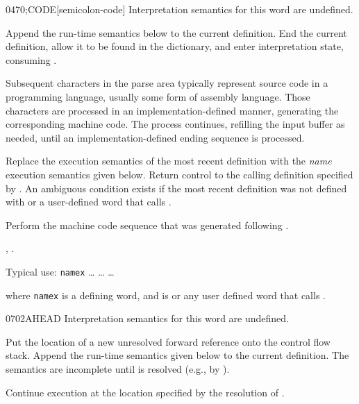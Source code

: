 \begin{worddef}{0470}{;CODE}[semicolon-code]
\interpret
	Interpretation semantics for this word are undefined.

\compile

	Append the run-time semantics below to the current definition.
	End the current definition, allow it to be found in the
	dictionary, and enter interpretation state, consuming
	.

	Subsequent characters in the parse area typically represent
	source code in a programming language, usually some form of
	assembly language. Those characters are processed in an
	implementation-defined manner, generating the corresponding
	machine code. The process continues, refilling the input buffer
	as needed, until an implementation-defined ending sequence is
	processed.

\runtime
	\stack{}{}

	Replace the execution semantics of the most recent definition
	with the \emph{name} execution semantics given below. Return
	control to the calling definition specified by .
	An ambiguous condition exists if the most recent definition was
	not defined with  or a user-defined word that
	calls .

\execute[name]

	Perform the machine code sequence that was generated following
	.

\see {},
	.

	\begin{rationale} %
		Typical use:
		\word[core]{:} \texttt{namex}
			{\ldots}  {\ldots}
		 {\ldots}

		where \texttt{namex} is a defining word, and  is
		 or any user defined word that calls
		.
	\end{rationale}
\end{worddef}


\begin{worddef}{0702}{AHEAD}
\interpret
	Interpretation semantics for this word are undefined.

\compile

	Put the location of a new unresolved forward reference
	 onto the control flow stack. Append the run-time
	semantics given below to the current definition. The semantics
	are incomplete until  is resolved (e.g., by
	).

\runtime
	\stack{}{}

	Continue execution at the location specified by the resolution
	of .

	\begin{testing}
		 \\
	\end{testing}
\end{worddef}


